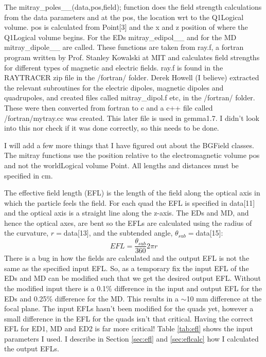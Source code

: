 \documentclass[letter,11pt]{article}
\newcommand{\filefont}[1]{{\scriptsize\ttfamily\selectfont #1}\xspace}
\begin{document}
The \filefont{mitray\_poles\_\_(data,pos,field);} function does the field strength calculations from the \filefont{data} parameters and at the \filefont{pos}, the location wrt to the \filefont{Q1Logical} volume. \filefont{pos} is calculated from \filefont{Point[3]} and the x and z position of where the \filefont{Q1Logical} volume begins. For the EDs \filefont{mitray\_edipol\_\_} and for the MD \filefont{mitray\_dipole\_\_} are called. These functions are taken from \filefont{ray.f}, a fortran program written by Prof. Stanley Kowalski at MIT and calculates field strengths for different types of magnetic and electric fields. \filefont{ray.f} is found in the RAYTRACER zip file in the /fortran/ folder. Derek Howell (I believe) extracted the relevant subroutines for the electric dipoles, magnetic dipoles and quadrupoles, and created files called mitray\_dipol.f etc, in the /fortran/ folder. These were then converted from fortran to c and a c++ file called /fortran/mytray.cc was created. This later file is used in gemma1.7. I didn't look into this nor check if it was done correctly, so this needs to be done.
 
I will add a few more things that I have figured out about the BGField classes. The \filefont{mitray} functions use the position relative to the electromagnetic volume \filefont{pos} and not the \filefont{worldLogical} volume \filefont{Point}. All lengths and distances must be specified in cm.

The effective field length (EFL) is the length of the field along the optical axis in which the particle feels the field. For each quad the EFL is specified in \filefont{data[11]} and the optical axis is a straight line along the z-axis. The EDs and MD, and hence the optical axes, are bent so the EFLs are calculated using the radius of the curvature, $r=$\filefont{data[13]}, and the subtended angle, $\theta_{sub}=$\filefont{data[15]}:
\begin{equation}\label{eq:eflcurve}
EFL=\frac{\theta_{sub}}{360}2\pi r
\end{equation}
There is a bug in how the fields are calculated and the output EFL is not the same as the specified input EFL. So, as a temporary fix the input EFL of the EDs and MD can be modified such that we get the desired output EFL. Without the modified input there is a 0.1\% difference in the input and output EFL for the EDs and 0.25\% difference for the MD. This results in a $\sim$10 mm difference at the focal plane. The input EFLs hasn't been modified for the quads yet, however a small difference in the EFL for the quads isn't that critical. Having the correct EFL for ED1, MD and ED2 is far more critical! Table \ref{tab:efl} shows the input parameters I used. I describe in Section \ref{sec:efl} and \ref{sec:eflcalc} how I calculated the output EFLs.
\end{document}
